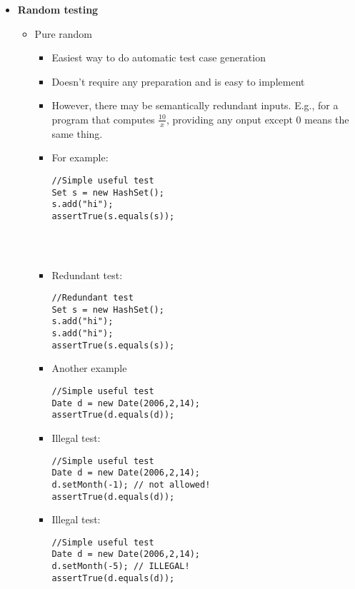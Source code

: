 \documentclass[12pt]{book}
\begin{document}
\begin{itemize}
    \item \textbf{Random testing}
    \begin{itemize}
        \item Pure random
        \begin{itemize}
            \item Easiest way to do automatic test case generation
            \item Doesn't require any preparation and is easy to implement
            \item However, there may be semantically redundant inputs. E.g., for a program that computes $\displaystyle\frac{10}{x}$, providing any onput except 0 means the same thing.
            \item For example:
            
            \begin{lstlisting}
//Simple useful test
Set s = new HashSet();
s.add("hi");
assertTrue(s.equals(s));
            
            
            
            \end{lstlisting}

            \item Redundant test:
            \begin{lstlisting}
//Redundant test
Set s = new HashSet();
s.add("hi");
s.add("hi");
assertTrue(s.equals(s));        
            \end{lstlisting}

            \item Another example
            \begin{lstlisting}
//Simple useful test
Date d = new Date(2006,2,14);
assertTrue(d.equals(d));
            \end{lstlisting}

            \item Illegal test:
            \begin{lstlisting}
//Simple useful test
Date d = new Date(2006,2,14);
d.setMonth(-1); // not allowed!
assertTrue(d.equals(d));
            \end{lstlisting}
                
            \item Illegal test:
            \begin{lstlisting}
//Simple useful test
Date d = new Date(2006,2,14);
d.setMonth(-5); // ILLEGAL!
assertTrue(d.equals(d));
            \end{lstlisting}


\end{itemize}
\end{itemize}
\end{itemize}
\end{document}
